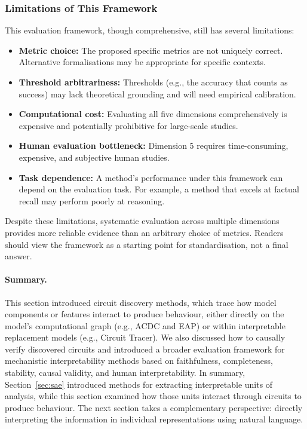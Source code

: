 \subsubsection{Limitations of This Framework}

This evaluation framework, though comprehensive, still has several limitations:

\begin{itemize}
\item \textbf{Metric choice:} The proposed specific metrics are not uniquely correct. Alternative formalisations may be appropriate for specific contexts.
\item \textbf{Threshold arbitrariness:} Thresholds (e.g., the accuracy that counts as success) may lack theoretical grounding and will need empirical calibration.
\item \textbf{Computational cost:} Evaluating all five dimensions comprehensively is expensive and potentially prohibitive for large-scale studies.
\item \textbf{Human evaluation bottleneck:} Dimension 5 requires time-consuming, expensive, and subjective human studies.
\item \textbf{Task dependence:} A method’s performance under this framework can depend on the evaluation task. For example, a method that excels at factual recall may perform poorly at reasoning.
\end{itemize}

Despite these limitations, systematic evaluation across multiple dimensions provides more reliable evidence than an arbitrary choice of metrics. Readers should view the framework as a starting point for standardisation, not a final answer.

\paragraph{Summary.}
This section introduced circuit discovery methods, which trace how model components or features interact to produce behaviour, either directly on the model’s computational graph (e.g., ACDC and EAP) or within interpretable replacement models (e.g., Circuit Tracer). We also discussed how to causally verify discovered circuits and introduced a broader evaluation framework for mechanistic interpretability methods based on faithfulness, completeness, stability, causal validity, and human interpretability. In summary, Section~\ref{sec:sae} introduced methods for extracting interpretable units of analysis, while this section examined how those units interact through circuits to produce behaviour. The next section takes a complementary perspective: directly interpreting the information in individual representations using natural language.
